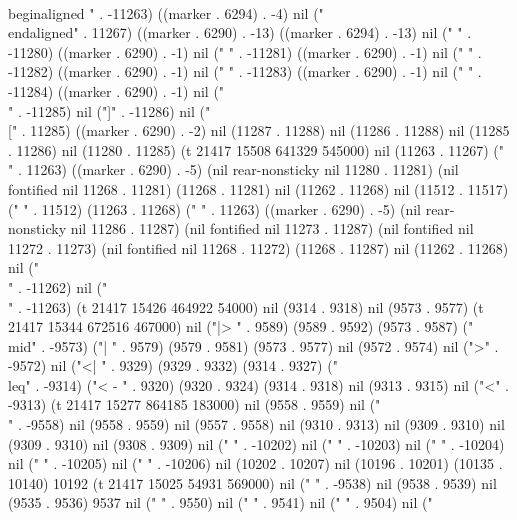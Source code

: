      \\begin{aligned}
" . -11263) ((marker . 6294) . -4) nil ("\\end{aligned}" . 11267) ((marker . 6290) . -13) ((marker . 6294) . -13) nil ("
" . -11280) ((marker . 6290) . -1) nil (" " . -11281) ((marker . 6290) . -1) nil (" " . -11282) ((marker . 6290) . -1) nil (" " . -11283) ((marker . 6290) . -1) nil (" " . -11284) ((marker . 6290) . -1) nil ("\\" . -11285) nil ("]" . -11286) nil ("\\[" . 11285) ((marker . 6290) . -2) nil (11287 . 11288) nil (11286 . 11288) nil (11285 . 11286) nil (11280 . 11285) (t 21417 15508 641329 545000) nil (11263 . 11267) ("     " . 11263) ((marker . 6290) . -5) (nil rear-nonsticky nil 11280 . 11281) (nil fontified nil 11268 . 11281) (11268 . 11281) nil (11262 . 11268) nil (11512 . 11517) ("    " . 11512) (11263 . 11268) ("         " . 11263) ((marker . 6290) . -5) (nil rear-nonsticky nil 11286 . 11287) (nil fontified nil 11273 . 11287) (nil fontified nil 11272 . 11273) (nil fontified nil 11268 . 11272) (11268 . 11287) nil (11262 . 11268) nil ("\\" . -11262) nil ("\\" . -11263) (t 21417 15426 464922 54000) nil (9314 . 9318) nil (9573 . 9577) (t 21417 15344 672516 467000) nil ("|>
" . 9589) (9589 . 9592) (9573 . 9587) ("\\mid" . -9573) ("|
" . 9579) (9579 . 9581) (9573 . 9577) nil (9572 . 9574) nil (">" . -9572) nil ("<|
" . 9329) (9329 . 9332) (9314 . 9327) ("\\leq" . -9314) ("<
-
" . 9320) (9320 . 9324) (9314 . 9318) nil (9313 . 9315) nil ("<" . -9313) (t 21417 15277 864185 183000) nil (9558 . 9559) nil ("\\" . -9558) nil (9558 . 9559) nil (9557 . 9558) nil (9310 . 9313) nil (9309 . 9310) nil (9309 . 9310) nil (9308 . 9309) nil ("
" . -10202) nil (" " . -10203) nil (" " . -10204) nil (" " . -10205) nil (" " . -10206) nil (10202 . 10207) nil (10196 . 10201) (10135 . 10140) 10192 (t 21417 15025 54931 569000) nil ("
" . -9538) nil (9538 . 9539) nil (9535 . 9536) 9537 nil ("
" . 9550) nil ("
" . 9541) nil ("
" . 9504) nil ("

